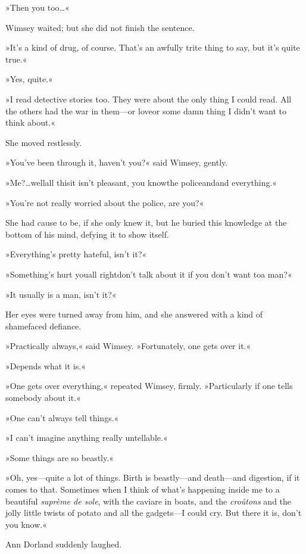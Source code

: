 »Then you too\dots«

Wimsey waited; but she did not finish the sentence.

»It's a kind of drug, of course. That's an awfully trite thing to say, but it's quite true.«

»Yes, quite.«

»I read detective stories too. They were about the only thing I could read. All the others had the war in them—or love\textellipsis  or some damn thing I didn't want to think about.«

She moved restlessly.

»You've been through it, haven't you?« said Wimsey, gently.

»Me?\dots well\textellipsis  all this\textellipsis  it isn't pleasant, you know\textellipsis  the police\textellipsis  and\textellipsis  and everything.«

»You're not really worried about the police, are you?«

She had cause to be, if she only knew it, but he buried this knowledge at the bottom of his mind, defying it to show itself.

»Everything's pretty hateful, isn't it?«

»Something's hurt you\textellipsis  all right\textellipsis  don't talk about it if you don't want to\textellipsis  a man?«

»It usually is a man, isn't it?«

Her eyes were turned away from him, and she answered with a kind of shamefaced defiance.

»Practically always,« said Wimsey. »Fortunately, one gets over it.«

»Depends what it is.«

»One gets over everything,« repeated Wimsey, firmly. »Particularly if one tells somebody about it.«

»One can't always tell things.«

»I can't imagine anything really untellable.«

»Some things are so beastly.«

»Oh, yes—quite a lot of things. Birth is beastly—and death—and digestion, if it comes to that. Sometimes when I think of what's happening inside me to a beautiful \textit{suprème de sole}, with the caviare in boats, and the \textit{croûtons} and the jolly little twists of potato and all the gadgets—I could cry. But there it is, don't you know.«

Ann Dorland suddenly laughed.

